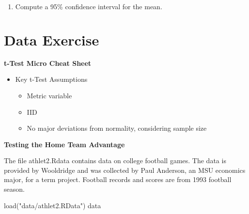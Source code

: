 \documentclass[
]{book}
\newenvironment{Shaded}{\begin{snugshade}}{\end{snugshade}}
\newcommand{\FunctionTok}[1]{\textcolor[rgb]{0.00,0.00,0.00}{#1}}
\newcommand{\NormalTok}[1]{#1}
\newcommand{\StringTok}[1]{\textcolor[rgb]{0.31,0.60,0.02}{#1}}
\providecommand{\tightlist}{%
  \setlength{\itemsep}{0pt}\setlength{\parskip}{0pt}}
\theoremstyle{definition}
\theoremstyle{definition}
\theoremstyle{definition}
\theoremstyle{definition}
\theoremstyle{remark}
\begin{document}
\begin{enumerate}
\def\labelenumi{\arabic{enumi}.}
\setcounter{enumi}{7}
\tightlist
\item
  Compute a 95\% confidence interval for the mean.
\end{enumerate}

\hypertarget{data-exercise}{%
\section{Data Exercise}\label{data-exercise}}

\textbf{t-Test Micro Cheat Sheet}

\begin{itemize}
\tightlist
\item
  Key t-Test Assumptions

  \begin{itemize}
  \tightlist
  \item
    Metric variable
  \item
    IID
  \item
    No major deviations from normality, considering sample size
  \end{itemize}
\end{itemize}

\textbf{Testing the Home Team Advantage}

The file athlet2.Rdata contains data on college football games. The data is provided by Wooldridge and was collected by Paul Anderson, an MSU economics major, for a term project. Football records and scores are from 1993 football season.

\begin{Shaded}
\begin{Highlighting}[]
\FunctionTok{load}\NormalTok{(}\StringTok{"data/athlet2.RData"}\NormalTok{)}
\NormalTok{data}
\end{Highlighting}
\end{Shaded}
\end{document}
